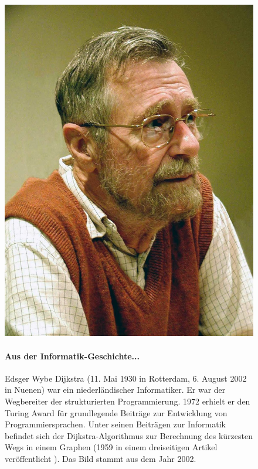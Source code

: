 \begin{figure}[htb]
\centering
\begin{minipage}[c]{0.25\textwidth}
\includegraphics[scale=0.09]{dijkstra}
\end{minipage}
\begin{minipage}[c]{0.7\textwidth}
\paragraph{Aus der Informatik-Geschichte...} Edsger Wybe Dijkstra (11. Mai 1930 in Rotterdam, 6. August 2002 in Nuenen) war ein niederländischer Informatiker. Er war der Wegbereiter der strukturierten Programmierung. 1972 erhielt er den Turing Award für grundlegende Beiträge zur Entwicklung von Programmiersprachen. Unter seinen Beiträgen zur Informatik befindet sich der Dijkstra-Algorithmus zur Berechnung des kürzesten Wegs in einem Graphen (1959 in einem dreiseitigen Artikel veröffentlicht \cite{dijkstra-paper-shortest-path}). Das Bild stammt aus dem Jahr 2002.
\end{minipage}
\end{figure}

